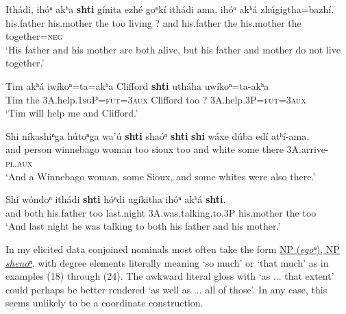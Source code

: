 \documentclass[output=paper]{LSP/langsci}
\begin{document}
\begin{exe}
\ex 
\gll  Ith\'adi, 	ih\'oⁿ  	akʰa 	\textbf{shti} 	g\'inita  	ezh\'e 	goⁿk\'i  	ith\'adi 	ama, 	 ih\'oⁿ 	akʰ\'a 	zh\'ugigtha=bazh\'i.\\
	his.father 	his.mother 	the 	too 	living 	?  	and  	his.father 	the 	his.mother 	the 	together=\textsc{neg}\\
\trans `His father and his mother are both alive, but his father and mother do not live 	together.'

\ex 
\gll Tim 	akʰ\'a 	iw\'ikoⁿ=ta=akʰa     Clifford \textbf{shti} uth\'aha 	uw\'ikoⁿ=ta-akʰa\\
Tim the	 \textsc{3A}.help.\textsc{1sgP}=\textsc{fut=3aux}  Clifford too 	? \textsc{3A}.help.\textsc{3P}=\textsc{fut=3aux}\\
\trans `Tim will help me and Clifford.'
  
\ex 
\gll Shi  n\'ikashiⁿga h\'utoⁿga  wa'\'u  \textbf{shti} sha\'oⁿ \textbf{shti} \textbf{shi} w\'axe d\'uba 	ed\'i 	atʰ\'i-ama.\\
and 	person  winnebago 	woman too sioux  too  and white 	some there \textsc{3A}.arrive-\textsc{pl.aux} \\
\trans `And a Winnebago woman, some Sioux, and some whites were also there.'

\ex	
\gll Shi 	w\'ondoⁿ 	ith\'adi  \textbf{shti } h\'oⁿdi 	ug\'ikitha  	ih\'oⁿ  	akʰ\'a  	\textbf{shti}.\\
	and 	both 	his.father 	too 	last.night 	\textsc{3A}.was.talking.to.\textsc{3P} 	his.mother 	the 	too\\
\trans`And last night he was talking to both his father and his mother.'
\end{exe}

In my elicited data conjoined nominals most often take the form \underline{NP (\textit{egoⁿ}), NP} \underline{\textit{shenoⁿ}}, with degree elements literally meaning `so much' or `that much' as in examples (18) through (24). The awkward literal gloss with `as ... that extent' could perhaps be better rendered `as well as ... all of those'. In any case, this seems unlikely to be a coordinate construction.
\end{document}
